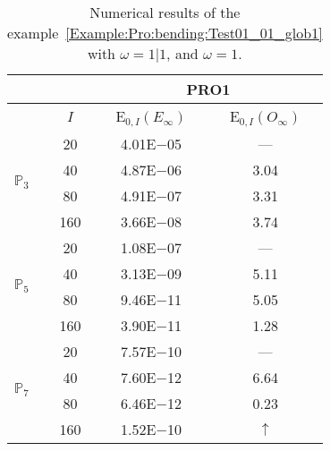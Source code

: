 \begin{table}[H]
\caption{Numerical results of the example~\ref{Example:Pro:bending:Test01_01_glob1} with $\omega=1|1$, and $\omega=1$.}
\setlength{\tabcolsep}{5pt}
\centering
\begin{tabular}{@{}l c c c@{}}
\toprule
 &  & \multicolumn{2}{c}{PRO1}\\
\midrule
 & $I$ & E$_{0,I}(E_{\infty})$ & E$_{0,I}(O_{\infty})$\\
\midrule
\multirow{4}{*}{$\mathbb{P}_{3}$} & 20 & 4.01E$-$05 & ---\\
 & 40 & 4.87E$-$06 & 3.04\\
 & 80 & 4.91E$-$07 & 3.31\\
 & 160 & 3.66E$-$08 & 3.74\\
\midrule
\multirow{4}{*}{$\mathbb{P}_{5}$} & 20 & 1.08E$-$07 & ---\\
 & 40 & 3.13E$-$09 & 5.11\\
 & 80 & 9.46E$-$11 & 5.05\\
 & 160 & 3.90E$-$11 & 1.28\\
\midrule
\multirow{4}{*}{$\mathbb{P}_{7}$} & 20 & 7.57E$-$10 & ---\\
 & 40 & 7.60E$-$12 & 6.64\\
 & 80 & 6.46E$-$12 & 0.23\\
 & 160 & 1.52E$-$10 & $\uparrow$\\
\bottomrule
\end{tabular}
\label{Table:PRO:test_01_01_test21}
\end{table}
